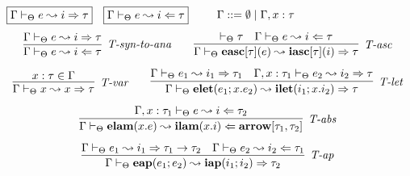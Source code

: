 \begin{figure}
$\fbox{$\Gamma \vdash_\Theta e \leadsto i \Rightarrow \tau$}$~
$\fbox{$\Gamma \vdash_\Theta e \leadsto i \Leftarrow \tau$}$~~~~
$\Gamma ::= \emptyset \mathrel{\mid} \Gamma, x : \tau$
\[
\begin{array}{c}
\infer[\textit{T-syn-to-ana}]
	{\Gamma \vdash_\Theta  e \leadsto i\Leftarrow \tau } 
	{\Gamma \vdash_\Theta e  \leadsto i\Rightarrow \tau  }
~~~~~~
\infer[\textit{T-asc}]
	{\Gamma  \vdash_\Theta \keyw{easc}[\tau](e) \leadsto \keyw{iasc}[\tau](i) \Rightarrow \tau}
	{\vdash_\Theta \tau & \Gamma \vdash_\Theta e \leadsto i \Leftarrow \tau} \\[2ex]

\infer[\textit{T-var}]
	{\Gamma \vdash_\Theta x \leadsto x \Rightarrow\tau } 
	{x:\tau \in \Gamma }
~~~~~~
\infer[\textit{T-let}]
    {\Gamma \vdash_\Theta \keyw{elet}(e_1; x.e_2) \leadsto \keyw{ilet}(i_1; x.i_2) \Rightarrow \tau}
    {\Gamma \vdash_\Theta e_1 \leadsto i_1 \Rightarrow \tau_1 &
    \Gamma, x : \tau_1 \vdash_\Theta e_2 \leadsto i_2 \Rightarrow \tau}\\[2ex]
\infer[\textit{T-abs}]
	{\Gamma \vdash_\Theta  \keyw{elam}(x . e) \leadsto \keyw{ilam}(x .i) \Leftarrow \keyw{arrow}[\tau_1, \tau_2]} 
	{\Gamma, x:\tau_1 \vdash_\Theta e\leadsto i\Leftarrow \tau_2 }\\[2ex]

\infer[\textit{T-ap}]
	{\Gamma \vdash_\Theta  \keyw{eap}(e_1; e_2) \leadsto \keyw{iap}(i_1; i_2) \Rightarrow \tau_2  } 
	{\Gamma \vdash_\Theta e_1 \leadsto i_1 \Rightarrow \tau_1 \rightarrow \tau_2    & \Gamma \vdash_\Theta e_2  \leadsto i_2 \Leftarrow \tau_1}\\[2ex]


\end{array}\]
\end{figure}
